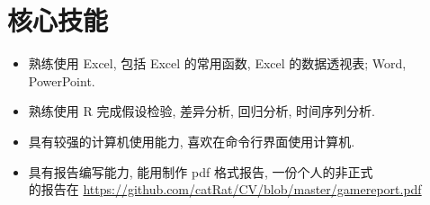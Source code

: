 \section{核心技能}
\begin{itemize}
\item 熟练使用 Excel, 包括 Excel 的常用函数, Excel 的数据透视表; Word, PowerPoint.
\item 熟练使用 R 完成假设检验, 差异分析, 回归分析, 时间序列分析.
\item 具有较强的计算机使用能力, 喜欢在命令行界面使用计算机.
\item 具有报告编写能力, 能用制作 pdf 格式报告, 一份个人的非正式 \\
的报告在 \url{https://github.com/catRat/CV/blob/master/gamereport.pdf}
\end{itemize}
